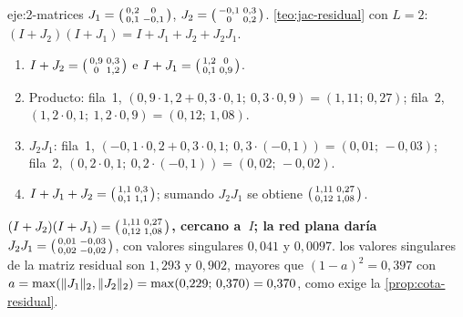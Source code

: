 \begin{solucion}{eje:2-matrices}
\datos $J_1=\begin{psmallmatrix}0{,}2&0\\0{,}1&-0{,}1\end{psmallmatrix}$, $J_2=\begin{psmallmatrix}-0{,}1&0{,}3\\0&0{,}2\end{psmallmatrix}$.
\planteamiento \cref{teo:jac-residual} con $L=2$: $(I+J_2)(I+J_1)=I+J_1+J_2+J_2J_1$.
\pasos
\begin{enumerate}[label=\arabic*.]
  \item $I+J_2=\begin{psmallmatrix}0{,}9&0{,}3\\0&1{,}2\end{psmallmatrix}$ e $I+J_1=\begin{psmallmatrix}1{,}2&0\\0{,}1&0{,}9\end{psmallmatrix}$.
  \item Producto: fila~1, $(0{,}9\cdot 1{,}2+0{,}3\cdot 0{,}1;\ 0{,}3\cdot 0{,}9)=(1{,}11;\,0{,}27)$; fila~2, $(1{,}2\cdot 0{,}1;\ 1{,}2\cdot 0{,}9)=(0{,}12;\,1{,}08)$.
  \item $J_2J_1$: fila~1, $(-0{,}1\cdot 0{,}2+0{,}3\cdot 0{,}1;\ 0{,}3\cdot(-0{,}1))=(0{,}01;\,-0{,}03)$; fila~2, $(0{,}2\cdot 0{,}1;\ 0{,}2\cdot(-0{,}1))=(0{,}02;\,-0{,}02)$.
  \item $I+J_1+J_2=\begin{psmallmatrix}1{,}1&0{,}3\\0{,}1&1{,}1\end{psmallmatrix}$; sumando $J_2J_1$ se obtiene $\begin{psmallmatrix}1{,}11&0{,}27\\0{,}12&1{,}08\end{psmallmatrix}$.
\end{enumerate}
\resultado \textbf{$(I+J_2)(I+J_1)=\begin{psmallmatrix}1{,}11&0{,}27\\0{,}12&1{,}08\end{psmallmatrix}$, cercano a~$I$; la red plana daría $J_2J_1=\begin{psmallmatrix}0{,}01&-0{,}03\\0{,}02&-0{,}02\end{psmallmatrix}$}, con valores singulares $0{,}041$ y $0{,}0097$.
\comprobacion los valores singulares de la matriz residual son $1{,}293$ y $0{,}902$, mayores que $(1-a)^{2}=0{,}397$ con $a=\max(\lVert J_1\rVert_2,\lVert J_2\rVert_2)=\max(0{,}229;\,0{,}370)=0{,}370$, como exige la \cref{prop:cota-residual}.
\end{solucion}


